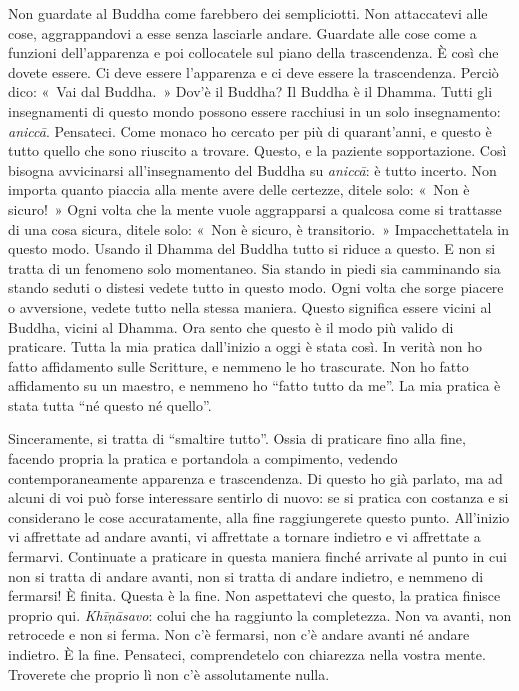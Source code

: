 Non guardate al Buddha come farebbero dei sempliciotti. Non attaccatevi
alle cose, aggrappandovi a esse senza lasciarle andare. Guardate alle
cose come a funzioni dell'apparenza e poi collocatele sul piano della
trascendenza. È così che dovete essere. Ci deve essere l'apparenza e ci
deve essere la trascendenza. Perciò dico: «~Vai dal Buddha.~» Dov'è il
Buddha? Il Buddha è il Dhamma. Tutti gli insegnamenti di questo mondo
possono essere racchiusi in un solo insegnamento: \emph{aniccā}.
Pensateci. Come monaco ho cercato per più di quarant'anni, e questo è
tutto quello che sono riuscito a trovare. Questo, e la paziente
sopportazione. Così bisogna avvicinarsi all'insegnamento del Buddha su
\emph{aniccā}: è tutto incerto. Non importa quanto piaccia alla mente
avere delle certezze, ditele solo: «~Non è sicuro!~» Ogni volta che la
mente vuole aggrapparsi a qualcosa come si trattasse di una cosa sicura,
ditele solo: «~Non è sicuro, è transitorio.~» Impacchettatela in questo
modo. Usando il Dhamma del Buddha tutto si riduce a questo. E non si
tratta di un fenomeno solo momentaneo. Sia stando in piedi sia
camminando sia stando seduti o distesi vedete tutto in questo modo. Ogni
volta che sorge piacere o avversione, vedete tutto nella stessa maniera.
Questo significa essere vicini al Buddha, vicini al Dhamma. Ora sento
che questo è il modo più valido di praticare. Tutta la mia pratica
dall'inizio a oggi è stata così. In verità non ho fatto affidamento
sulle Scritture, e nemmeno le ho trascurate. Non ho fatto affidamento su
un maestro, e nemmeno ho ``fatto tutto da me''. La mia pratica è stata
tutta ``né questo né quello''.

Sinceramente, si tratta di ``smaltire tutto''. Ossia di praticare fino
alla fine, facendo propria la pratica e portandola a compimento, vedendo
contemporaneamente apparenza e trascendenza. Di questo ho già parlato,
ma ad alcuni di voi può forse interessare sentirlo di nuovo: se si
pratica con costanza e si considerano le cose accuratamente, alla fine
raggiungerete questo punto. All'inizio vi affrettate ad andare avanti,
vi affrettate a tornare indietro e vi affrettate a fermarvi. Continuate
a praticare in questa maniera finché arrivate al punto in cui non si
tratta di andare avanti, non si tratta di andare indietro, e nemmeno di
fermarsi! È finita. Questa è la fine. Non aspettatevi che questo, la
pratica finisce proprio qui. \emph{Khīṇāsavo}: colui che ha raggiunto la
completezza. Non va avanti, non retrocede e non si ferma. Non c'è
fermarsi, non c'è andare avanti né andare indietro. È la fine.
Pensateci, comprendetelo con chiarezza nella vostra mente. Troverete che
proprio lì non c'è assolutamente nulla.

